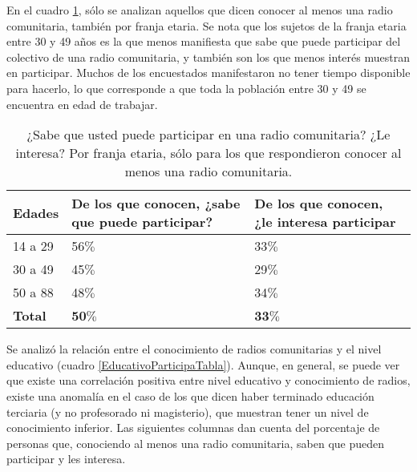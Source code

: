 \indent En el cuadro \ref{SabePuedeParticiparEdadTabla}, sólo se analizan aquellos que dicen conocer al menos una radio comunitaria, también por franja etaria. Se nota que los sujetos de la franja etaria entre 30 y 49 años es la que menos manifiesta que sabe que puede participar del colectivo de una radio comunitaria, y también son los que menos interés muestran en participar. Muchos de los encuestados manifestaron no tener tiempo disponible para hacerlo, lo que corresponde a que toda la población entre 30 y 49 se encuentra en edad de trabajar.\\

\begin{table}[htpb]
	\centering
{}
		\begin{tabular}{|p{1.5cm}|p{4cm}|p{3.8cm}|}\hline
      \textbf{Edades}&\textbf{De los que conocen, ¿sabe que puede participar?}&\textbf{De los que conocen, ¿le interesa participar}\\\hline\hline
			14 a 29	&	56$\%$&33$\%$\\\hline
			30 a 49 	&	45$\%$&29$\%$\\\hline
			50 a 88 	&	48$\%$&34$\%$\\\hline\hline
			\textbf{Total}	&\textbf{50$\%$}&\textbf{33$\%$}\\\hline
		\end{tabular}
	  \caption{¿Sabe que usted puede participar en una radio comunitaria? ¿Le interesa? Por franja etaria, sólo para los que respondieron conocer al menos una radio comunitaria.}
	  \label{SabePuedeParticiparEdadTabla}
\end{table}

\indent Se analizó la relación entre el conocimiento de radios comunitarias y el nivel educativo (cuadro \ref{EducativoParticipaTabla}). Aunque, en general, se puede ver que existe una correlación positiva entre nivel educativo y conocimiento de radios, existe una anomalía en el caso de los que dicen haber terminado educación terciaria (y no profesorado ni magisterio), que muestran tener un nivel de conocimiento inferior. Las siguientes columnas dan cuenta del porcentaje de personas que, conociendo al menos una radio comunitaria, saben que pueden participar y les interesa.\\

